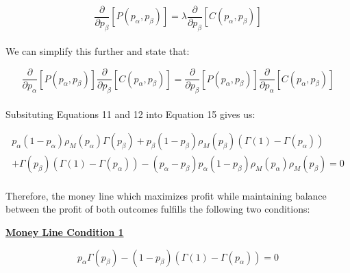 \documentclass[12pt,letterpaper]{article}
\begin{document}
\begin{equation}
\frac{\partial}{\partial p_\beta} [P(p_\alpha,p_\beta)] = \lambda \frac{\partial}{\partial p_\beta} [C(p_\alpha,p_\beta)] 
\end{equation}

\paragraph{} We can simplify this further and state that:

\begin{equation}
\frac{\partial}{\partial p_\alpha} [P(p_\alpha,p_\beta)] \frac{\partial}{\partial p_\beta} [C(p_\alpha,p_\beta)]  = \frac{\partial}{\partial p_\beta} [P(p_\alpha,p_\beta)]  \frac{\partial}{\partial p_\alpha} [C(p_\alpha,p_\beta)] 
\end{equation}

\paragraph{} Subsituting Equations 11 and 12 into Equation 15 gives us:

\begin{equation}
\begin{split}
p_\alpha (1-p_\alpha) \rho_M(p_\alpha) \Gamma(p_\beta) + p_\beta (1-p_\beta) \rho_M(p_\beta) (\Gamma(1)-\Gamma(p_\alpha))  \hspace{10pt}\\
+ \Gamma(p_\beta)(\Gamma(1)-\Gamma(p_\alpha)) - (p_\alpha - p_\beta) p_\alpha (1 - p_\beta) \rho_M(p_\alpha) \rho_M(p_\beta) = 0
\end{split}
\end{equation}

\paragraph{} Therefore, the money line which maximizes profit while maintaining balance between the profit of both outcomes fulfills the following two conditions: \\

\begin{center}
\underline{\textbf{Money Line Condition 1}}
\end{center}
\vspace{-1pt}

\begin{equation}
p_\alpha \Gamma(p_\beta) - (1-p_\beta)(\Gamma(1)-\Gamma(p_\alpha))  = 0
\end{equation}
\end{document}
